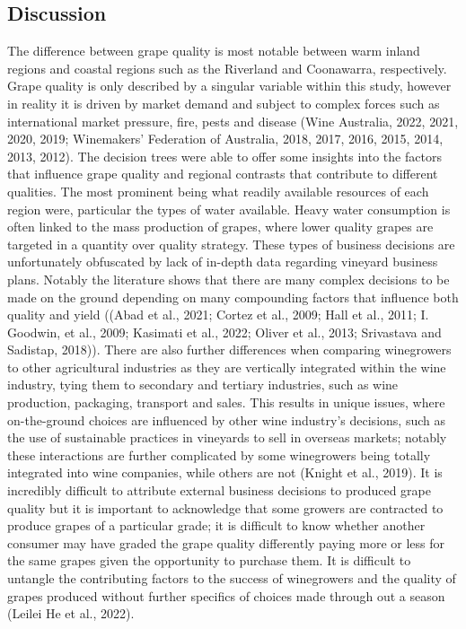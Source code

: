 \documentclass[review,12pt,authoryear]{elsarticle}
\begin{document}
\begin{linenumbers}
\section{Discussion}
The difference between grape quality is most notable between warm inland regions and coastal regions such as the Riverland and Coonawarra, respectively. Grape quality is only described by a singular variable within this study, however in reality it is driven by market demand and subject to  complex forces such as international market pressure, fire, pests and disease (Wine Australia, 2022, 2021, 2020, 2019; Winemakers’ Federation of Australia, 2018, 2017, 2016, 2015, 2014, 2013, 2012).
The decision trees were able to offer some insights into the factors that influence grape quality and regional contrasts that contribute to different qualities. The most prominent being what readily available resources of each region were, particular the types of water available. Heavy water consumption is often linked to the mass production of grapes, where lower quality grapes are targeted in a quantity over quality strategy. These types of business decisions are unfortunately obfuscated by lack of in-depth data regarding vineyard business plans. Notably the literature shows that there are many complex decisions to be made on the ground depending on many compounding factors that influence both quality and yield ((Abad et al., 2021; Cortez et al., 2009; Hall et al., 2011; I. Goodwin, et al., 2009; Kasimati et al., 2022; Oliver et al., 2013; Srivastava and Sadistap, 2018)). There are also further differences when comparing winegrowers to other agricultural industries as they are vertically integrated within the wine industry, tying them to secondary and tertiary industries, such as wine production, packaging, transport and sales. This results in unique issues, where on-the-ground choices are influenced by other wine industry’s decisions, such as the use of sustainable practices in vineyards to sell in overseas markets; notably these interactions are further complicated by some winegrowers being totally integrated into wine companies, while others are not (Knight et al., 2019). It is incredibly difficult to attribute external business decisions to produced grape quality but it is important to acknowledge that some growers are contracted to produce grapes of a particular grade; it is difficult to know whether another consumer may have graded the grape quality differently paying more or less for the same grapes given the opportunity to purchase them. It is difficult to untangle the contributing factors to the success of winegrowers and the quality of grapes produced without further specifics of choices made through out a season (Leilei He et al., 2022).


\end{linenumbers}
\end{document}
